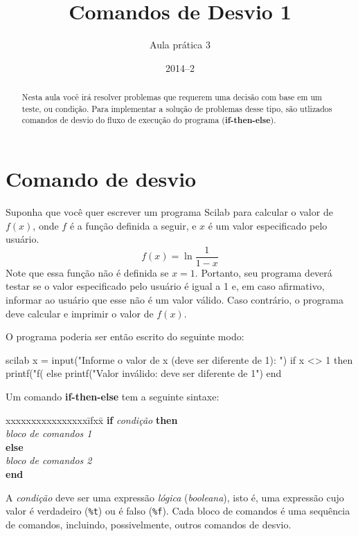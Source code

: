 \documentclass[11pt,fleqn]{practice}
\begin{document}
\subtitle{Aula prática 3}
\title{Comandos de Desvio 1}
\author{}
\date{2014--2}
\maketitle


\begin{abstract}
  Nesta aula você irá resolver problemas que requerem uma decisão com
  base em um teste, ou condição. Para implementar a solução de problemas
  desse tipo, são utlizados comandos de desvio do fluxo de execução do
  programa (\textbf{if-then-else}).
\end{abstract}

\tableofcontents

\section{Comando de desvio}

Suponha que você quer escrever um programa Scilab para calcular o valor
de $f(x)$, onde $f$ é a função definida a seguir, e $x$ é um valor
especificado pelo usuário.
\[ f(x) = \ln \frac{1}{1-x}\]
Note que essa função não é definida se $x=1$. Portanto, seu programa
deverá testar se o valor especificado pelo usuário é igual a 1 e, em
caso afirmativo, informar ao usuário que esse não é um valor
válido. Caso contrário, o programa deve calcular e imprimir o valor de
$f(x)$.

O programa poderia ser então escrito do seguinte modo:
\begin{lst}{scilab}
x = input("Informe o valor de x (deve ser diferente de 1): ")
if x <> 1 then 
    printf("f(%
else 
    printf("Valor inválido: deve ser diferente de 1\n")
end
\end{lst} 

Um comando \textbf{if-then-else} tem a seguinte sintaxe:

\begin{tabbing} xxxxxxxxxxxxxxxx\=ifxx\= \+\kill
      \textbf{if}  \emph{condição} \textbf{then} \\
	   \>\emph{bloco de comandos 1} \\
     \textbf{else} \\
	   \> \emph{bloco de comandos 2} \\
     \textbf{end}
\end{tabbing}

A \emph{condição} deve ser uma expressão \emph{lógica}
(\emph{booleana}), isto é, uma expressão cujo valor é verdadeiro
(\texttt{\%t}) ou é falso (\texttt{\%f}). Cada bloco de comandos é uma
sequência de comandos, incluindo, possivelmente, outros comandos de
desvio.
\end{document}
